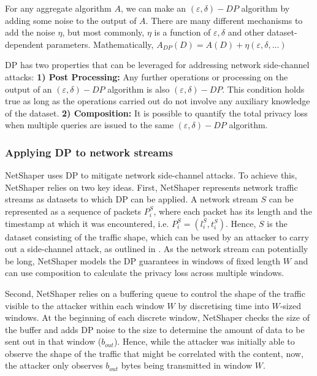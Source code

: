 For any aggregate algorithm $A$, we can make an $(\varepsilon, \delta)-DP$ algorithm by adding some noise to the output of $A$.
There are many different mechanisms to add the noise $\eta$, but most commonly, $\eta$ is a function of $\varepsilon, \delta$ and other dataset-dependent parameters. 
Mathematically, $A_{DP}(D) = A(D) + \eta(\varepsilon, \delta, ...)$

DP has two properties that can be leveraged for addressing network side-channel attacks: 
\textbf{1) Post Processing:} Any further operations or processing on the output of an $(\varepsilon, \delta)-DP$ algorithm is also $(\varepsilon, \delta)-DP$.
This condition holds true as long as the operations carried out do not involve any auxiliary knowledge of the dataset.
\textbf{2) Composition:} It is possible to quantify the total privacy loss when multiple queries are issued to the same $(\varepsilon, \delta)-DP$ algorithm.

\subsubsection{Applying DP to network streams}
\label{subsubsec:netshaper-background-framework-applying-dp}
NetShaper uses DP to mitigate network side-channel attacks. 
To achieve this, NetShaper relies on two key ideas.
First, NetShaper represents network traffic streams as datasets to which DP can be applied.
A network stream $S$ can be represented as a sequence of packets $P_i^S$, where each packet has its length and the timestamp at which it was encountered, i.e. $P_i^S = (l_i^S, t_i^S)$.
Hence, $S$ is the dataset consisting of the traffic shape, which can be used by an attacker to carry out a side-channel attack, as outlined in .
As the network stream can potentially be long, NetShaper models the DP guarantees in windows of fixed length $W$ and can use composition to calculate the privacy loss across multiple windows.

Second, NetShaper relies on a buffering queue to control the shape of the traffic visible to the attacker within each window $W$ by discretising time into $W$-sized windows.
At the beginning of each discrete window, NetShaper checks the size of the buffer and adds DP noise to the size to determine the amount of data to be sent out in that window ($b_{out}$).
Hence, while the attacker was initially able to observe the shape of the traffic that might be correlated with the content, now, the attacker only observes $b_{out}$ bytes being transmitted in window $W$.



